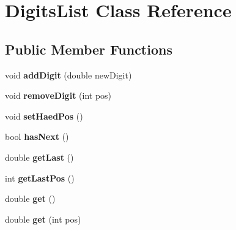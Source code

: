 \hypertarget{class_digits_list}{}\section{Digits\+List Class Reference}
\label{class_digits_list}
\subsection*{Public Member Functions}
\begin{DoxyCompactItemize}
\item 
\hypertarget{class_digits_list_a09507db08df6c7c6013965e14f89e035}{}void {\bfseries add\+Digit} (double new\+Digit)\label{class_digits_list_a09507db08df6c7c6013965e14f89e035}

\item 
\hypertarget{class_digits_list_a28fd1ee834c98ed64dbcafe18f710e9d}{}void {\bfseries remove\+Digit} (int pos)\label{class_digits_list_a28fd1ee834c98ed64dbcafe18f710e9d}

\item 
\hypertarget{class_digits_list_ae53ff58f37f8bf8fde9ef53ab2c6c502}{}void {\bfseries set\+Haed\+Pos} ()\label{class_digits_list_ae53ff58f37f8bf8fde9ef53ab2c6c502}

\item 
\hypertarget{class_digits_list_a0494cb6bf482dbdfb45450e0ed9d3261}{}bool {\bfseries has\+Next} ()\label{class_digits_list_a0494cb6bf482dbdfb45450e0ed9d3261}

\item 
\hypertarget{class_digits_list_a41466643c41254be527aa5f17d1989bd}{}double {\bfseries get\+Last} ()\label{class_digits_list_a41466643c41254be527aa5f17d1989bd}

\item 
\hypertarget{class_digits_list_a36af51d541c102211cd7074b3d16c5f6}{}int {\bfseries get\+Last\+Pos} ()\label{class_digits_list_a36af51d541c102211cd7074b3d16c5f6}

\item 
\hypertarget{class_digits_list_a17be0b253cd525d4eff97af9d780ad72}{}double {\bfseries get} ()\label{class_digits_list_a17be0b253cd525d4eff97af9d780ad72}

\item 
\hypertarget{class_digits_list_ab9ec988cf479472b1856524c3acaf3ca}{}double {\bfseries get} (int pos)\label{class_digits_list_ab9ec988cf479472b1856524c3acaf3ca}

\end{DoxyCompactItemize}
